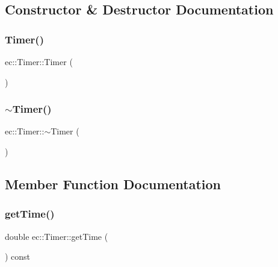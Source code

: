 \subsection{Constructor \& Destructor Documentation}
\mbox{\label{classec_1_1_timer_afa10f411221610c507291183b6b6aa56}} 
\subsubsection{\texorpdfstring{Timer()}{Timer()}}
{\footnotesize\ttfamily ec\+::\+Timer\+::\+Timer (\begin{DoxyParamCaption}{ }\end{DoxyParamCaption})\hspace{0.3cm}{\ttfamily [explicit]}}

\mbox{\label{classec_1_1_timer_a496dc6127f9d0c8ec3dc8d91de6b6448}} 
\subsubsection{\texorpdfstring{$\sim$\+Timer()}{~Timer()}}
{\footnotesize\ttfamily ec\+::\+Timer\+::$\sim$\+Timer (\begin{DoxyParamCaption}{ }\end{DoxyParamCaption})\hspace{0.3cm}{\ttfamily [default]}}



\subsection{Member Function Documentation}
\mbox{\label{classec_1_1_timer_a70c1b163f49e71696a632f2d43bec957}} 
\subsubsection{\texorpdfstring{get\+Time()}{getTime()}}
{\footnotesize\ttfamily double ec\+::\+Timer\+::get\+Time (\begin{DoxyParamCaption}{ }\end{DoxyParamCaption}) const}

